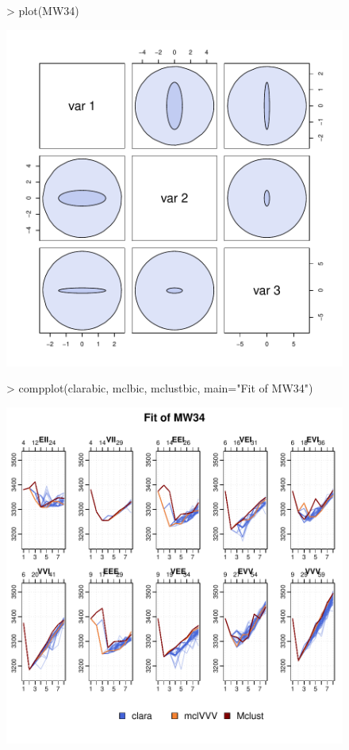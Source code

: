 \begin{figure}[h!]
\begin{Schunk}
\begin{Sinput}
>     plot(MW34)
\end{Sinput}
\end{Schunk}
\includegraphics{chapter3-figMW34}
\end{figure}



\begin{figure}[h!]
\begin{Schunk}
\begin{Sinput}
>     compplot(clarabic, mclbic, mclustbic, main="Fit of MW34")
\end{Sinput}
\end{Schunk}
\includegraphics{chapter3-figMW34bic}
\end{figure}

